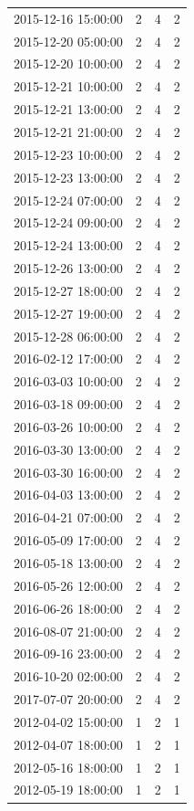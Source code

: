 \begin{tabular}{lrrr}
2015-12-16 15:00:00 & 2 & 4 & 2 \\
2015-12-20 05:00:00 & 2 & 4 & 2 \\
2015-12-20 10:00:00 & 2 & 4 & 2 \\
2015-12-21 10:00:00 & 2 & 4 & 2 \\
2015-12-21 13:00:00 & 2 & 4 & 2 \\
2015-12-21 21:00:00 & 2 & 4 & 2 \\
2015-12-23 10:00:00 & 2 & 4 & 2 \\
2015-12-23 13:00:00 & 2 & 4 & 2 \\
2015-12-24 07:00:00 & 2 & 4 & 2 \\
2015-12-24 09:00:00 & 2 & 4 & 2 \\
2015-12-24 13:00:00 & 2 & 4 & 2 \\
2015-12-26 13:00:00 & 2 & 4 & 2 \\
2015-12-27 18:00:00 & 2 & 4 & 2 \\
2015-12-27 19:00:00 & 2 & 4 & 2 \\
2015-12-28 06:00:00 & 2 & 4 & 2 \\
2016-02-12 17:00:00 & 2 & 4 & 2 \\
2016-03-03 10:00:00 & 2 & 4 & 2 \\
2016-03-18 09:00:00 & 2 & 4 & 2 \\
2016-03-26 10:00:00 & 2 & 4 & 2 \\
2016-03-30 13:00:00 & 2 & 4 & 2 \\
2016-03-30 16:00:00 & 2 & 4 & 2 \\
2016-04-03 13:00:00 & 2 & 4 & 2 \\
2016-04-21 07:00:00 & 2 & 4 & 2 \\
2016-05-09 17:00:00 & 2 & 4 & 2 \\
2016-05-18 13:00:00 & 2 & 4 & 2 \\
2016-05-26 12:00:00 & 2 & 4 & 2 \\
2016-06-26 18:00:00 & 2 & 4 & 2 \\
2016-08-07 21:00:00 & 2 & 4 & 2 \\
2016-09-16 23:00:00 & 2 & 4 & 2 \\
2016-10-20 02:00:00 & 2 & 4 & 2 \\
2017-07-07 20:00:00 & 2 & 4 & 2 \\
2012-04-02 15:00:00 & 1 & 2 & 1 \\
2012-04-07 18:00:00 & 1 & 2 & 1 \\
2012-05-16 18:00:00 & 1 & 2 & 1 \\
2012-05-19 18:00:00 & 1 & 2 & 1 \\

\end{tabular}
